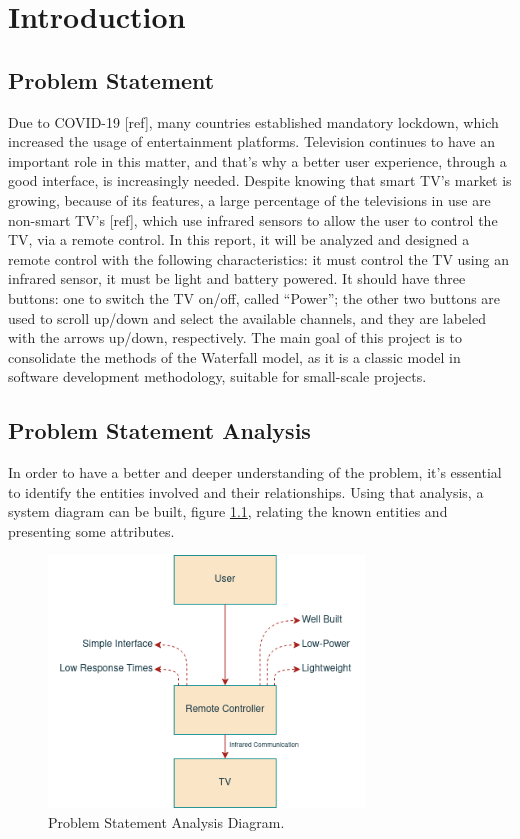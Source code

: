 \documentclass[12pt, letterpaper]{report}
\begin{document}
\tableofcontents
\clearpage
\chapter{Introduction}
\section{Problem Statement}
Due to COVID-19 [ref], many countries established mandatory lockdown, which increased the usage of entertainment platforms. Television continues to have an important role in this matter, and that’s why a better user experience, through a good interface, is increasingly needed.
Despite knowing that smart TV’s market is growing, because of its features, a large percentage of the televisions in use are non-smart TV’s [ref], which use infrared sensors to allow the user to control the TV, via a remote control. In this report, it will be analyzed and designed a remote control with the following characteristics: it must control the TV using an infrared sensor, it must be light and battery powered. It should have three buttons: one to switch the TV on/off, called “Power”; the other two buttons are used to scroll up/down and select the available channels, and they are labeled with the arrows up/down, respectively. The main goal of this project is to consolidate the methods of the Waterfall model, as it is a classic model in software development methodology, suitable for small-scale projects.

\section{Problem Statement Analysis}
In order to have a better and deeper understanding of the problem, it’s essential to identify the entities involved and their relationships. Using that analysis, a system diagram can be built, figure \ref{fig:prob_statement}, relating the known entities and presenting some attributes.

\begin{figure}[ht]
	\centering
	\includegraphics[width=0.75\textwidth]{prob_statement}
	\caption{Problem Statement Analysis Diagram.}
	\label{fig:prob_statement}
\end{figure}
\end{document}
